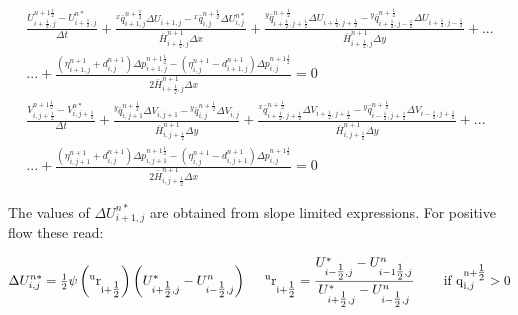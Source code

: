 \documentclass{article}
\begin{document}
\noindent 
\begin{equation} \label{ZEqnNum382659} 
\begin{array}{r} {\frac{U_{i+{\tfrac{1}{2}} ,j}^{n+1{\tfrac{1}{2}} } -U_{i+{\tfrac{1}{2}} ,j}^{n*} }{\Delta t} +\frac{{}^{x} \bar{q}_{i+1,j}^{n+{\tfrac{1}{2}} } \Delta U_{i+1,j}^{} -{}^{x} \bar{q}_{i,j}^{n+{\tfrac{1}{2}} } \Delta U_{i,j}^{n*} }{\bar{H}_{i+{\tfrac{1}{2}} ,j}^{n+1} \Delta x} +\frac{{}^{y} \bar{q}_{i+{\tfrac{1}{2}} ,j+{\tfrac{1}{2}} }^{n+{\tfrac{1}{2}} } \Delta U_{i+{\tfrac{1}{2}} ,j+{\tfrac{1}{2}} }^{} -{}^{y} \bar{q}_{i+{\tfrac{1}{2}} ,j-{\tfrac{1}{2}} }^{n+{\tfrac{1}{2}} } \Delta U_{i+{\tfrac{1}{2}} ,j-{\tfrac{1}{2}} }^{} }{\bar{H}_{i+{\tfrac{1}{2}} ,j}^{n+1} \Delta y} +...} \\ {...+\frac{\left(\eta _{i+1,j}^{n+1} +d_{i,j}^{n+1} \right)\Delta p_{i+1,j}^{n+1{\tfrac{1}{2}} } -\left(\eta _{i,j}^{n+1} -d_{i+1,j}^{n+1} \right)\Delta p_{i,j}^{n+1{\tfrac{1}{2}} } }{2\bar{H}_{i+{\tfrac{1}{2}} ,j}^{n+1} \Delta x} =0} \\ {\frac{V_{i,j+{\tfrac{1}{2}} }^{n+1{\tfrac{1}{2}} } -V_{i,j+{\tfrac{1}{2}} }^{n*} }{\Delta t} +\frac{{}^{y} \bar{q}_{i,j+1}^{n+{\tfrac{1}{2}} } \Delta V_{i,j+1}^{} -{}^{y} \bar{q}_{i,j}^{n+{\tfrac{1}{2}} } \Delta V_{i,j}^{} }{\bar{H}_{i,j+{\tfrac{1}{2}} }^{n+1} \Delta y} +\frac{{}^{x} \bar{q}_{i+{\tfrac{1}{2}} ,j+{\tfrac{1}{2}} }^{n+{\tfrac{1}{2}} } \Delta V_{i+{\tfrac{1}{2}} ,j+{\tfrac{1}{2}} }^{} -{}^{y} \bar{q}_{i-{\tfrac{1}{2}} ,j+{\tfrac{1}{2}} }^{n+{\tfrac{1}{2}} } \Delta V_{i-{\tfrac{1}{2}} ,j+{\tfrac{1}{2}} }^{} }{\bar{H}_{i,j+{\tfrac{1}{2}} }^{n+1} \Delta y} +...} \\ {...+\frac{\left(\eta _{i,j+1}^{n+1} +d_{i,j}^{n+1} \right)\Delta p_{i,j+1}^{n+1{\tfrac{1}{2}} } -\left(\eta _{i,j}^{n+1} -d_{i,j+1}^{n+1} \right)\Delta p_{i,j}^{n+1{\tfrac{1}{2}} } }{2\bar{H}_{i,j+{\tfrac{1}{2}} }^{n+1} \Delta x} =0} \end{array} 
\end{equation} 


\noindent The values of $\Delta U_{i+1,j}^{n*} $ are obtained from slope limited expressions. For positive flow these read:

\noindent 
\begin{equation} \label{ZEqnNum771022} 
\Delta U_{i,j}^{n*} ={\tfrac{1}{2}} \psi \left(^{{\rm u}} {\rm r}_{{\rm i+}{\tfrac{{\rm 1}}{{\rm 2}}} }^{} \right)\left(U_{i+{\tfrac{1}{2}} ,j}^{*} -U_{i-{\tfrac{1}{2}} ,j}^{n} \right){\rm \; \; \; \; \; }^{{\rm u}} {\rm r}_{{\rm i+}{\tfrac{{\rm 1}}{{\rm 2}}} }^{} =\frac{U_{i-{\tfrac{1}{2}} ,j}^{*} -U_{i-1{\tfrac{1}{2}} ,j}^{n} }{U_{i+{\tfrac{1}{2}} ,j}^{*} -U_{i-{\tfrac{1}{2}} ,j}^{n} } {\rm \; \; \; \; \; \; \; \; if\; q}_{{\rm i},j}^{{\rm n+}{\tfrac{{\rm 1}}{{\rm 2}}} } >0 
\end{equation} 
\end{document}

